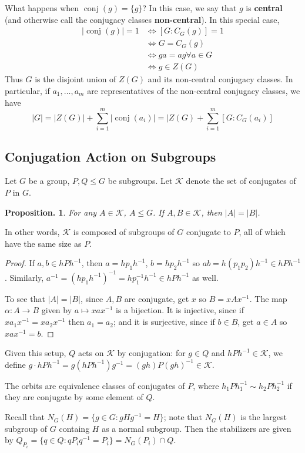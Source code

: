 \documentclass[11pt, a4paper]{memoir}
\newcommand{\mbf}[1]{{\boldmath\bfseries #1}}
\theoremstyle{change}
\newtheorem{proposition}[theorem]{Proposition.}
\theoremstyle{plain}
\theoremstyle{nonumberplain}
\newtheorem{proof}{Proof}
\DeclareMathOperator{\conj}{conj}
\numberwithin{equation}{section}
\begin{document}
What happens when $\conj(g)=\{g\}$?
In this case, we say that $g$ is \mbf{central} (and otherwise call the conjugacy classes \mbf{non-central}).
In this special case,
\begin{align*}
    |\conj(g)|=1 &\iff [G:C_G(g)]=1\\
                 &\iff G=C_G(g)\\
                 &\iff ga=ag\forall a\in G\\
                 &\iff g\in Z(G)
\end{align*}
Thus $G$ is the disjoint union of $Z(G)$ and its non-central conjugacy classes.
In particular, if $a_1,\ldots,a_m$ are representatives of the non-central conjugacy classes, we have
\begin{equation*}
    |G|=|Z(G)|+\sum\limits_{i=1}^m|\conj(a_i)|=|Z(G)+\sum\limits_{i=1}^m[G:C_G(a_i)]
\end{equation*}
\subsection{Conjugation Action on Subgroups}
Let $G$ be a group, $P,Q\leq G$ be subgroups.
Let $\mathcal{K}$ denote the set of conjugates of $P$ in $G$.
\begin{proposition}
    For any $A\in\mathcal{K}$, $A\leq G$.
    If $A,B\in\mathcal{K}$, then $|A|=|B|$.
\end{proposition}
In other words, $\mathcal{K}$ is composed of subgroups of $G$ conjugate to $P$, all of which have the same size as $P$.
\begin{proof}
    If $a,b\in hPh^{-1}$, then $a=hp_1h^{-1}$, $b=hp_2h^{-1}$ so $ab=h(p_1p_2)h^{-1}\in hPh^{-1}$.
    Similarly, $a^{-1}=(hp_1h^{-1})^{-1}=hp_1^{-1}h^{-1}\in hPh^{-1}$ as well.
    
    To see that $|A|=|B|$, since $A,B$ are conjugate, get $x$ so $B=xAx^{-1}$.
    The map $\alpha:A\to B$ given by $a\mapsto xax^{-1}$ is a bijection.
    It is injective, since if $xa_1x^{-1}=xa_2x^{-1}$ then $a_1=a_2$; and it is surjective, since if $b\in B$, get $a\in A$ so $xax^{-1}=b$.
\end{proof}
Given this setup, $Q$ acts on $\mathcal{K}$ by conjugation: for $g\in Q$ and $hPh^{-1}\in\mathcal{K}$, we define $g\cdot hPh^{-1}=g(hPh^{-1})g^{-1}=(gh)P(gh)^{-1}\in\mathcal{K}$.

The orbits are equivalence classes of conjugates of $P$, where $h_1Ph_1^{-1}\sim h_2Ph_2^{-1}$ if they are conjugate by some element of $Q$.

Recall that $N_G(H)=\{g\in G:gHg^{-1}=H\}$; note that $N_G(H)$ is the largest subgroup of $G$ containg $H$ as a normal subgroup.
Then the stabilizers are given by $Q_{P_i}=\{q\in Q:qP_iq^{-1}=P_i\}=N_G(P_i)\cap Q$.
\end{document}

